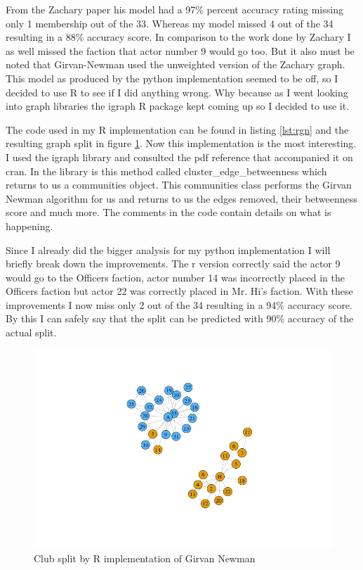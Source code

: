 \documentclass[letterpaper,10pt]{article}
\begin{document}
From the Zachary paper his model had a 97\% percent accuracy rating missing only 1 membership out of the 33. Whereas my model missed 4 out of the 34 resulting in a 88\% accuracy score. In comparison to the work done by Zachary I as well missed the faction that actor number 9 would go too. But it also must be noted that Girvan-Newman used the unweighted version of the Zachary graph.
\newline \newline
This model as produced by the python implementation seemed to be off, so I decided to use R to see if I did anything wrong. Why because as I went looking into graph libraries the igraph R package kept coming up so I decided to use it. 

The code used in my R implementation can be found in listing \ref{lst:rgn} and the resulting graph split in figure \ref{fig:psplit2}. Now this implementation is the most interesting. I used the igraph library and consulted the pdf reference that accompanied it on cran\cite{igraph}. In the library is this method called cluster\_edge\_betweenness which returns to us a communities object. This communities class performs the Girvan Newman algorithm for us and returns to us the edges removed, their betweenness score and much more. The comments in the code contain details on what is happening.

Since I already did the bigger analysis for my python implementation I will briefly break down the improvements. The r version correctly said the actor 9 would go to the Officers faction, actor number 14 was incorrectly placed in the Officers faction but actor 22 was correctly placed in Mr. Hi's faction. With these improvements I now miss only 2 out of the 34 resulting in a 94\% accuracy score. 
\newline
By this I can safely say that the split can be predicted with 90\% accuracy of the actual split. 


\begin{figure}
\begin{center}
\includegraphics[scale=0.5]{RSplitClub.png}
\caption{Club split by R implementation of Girvan Newman}
\label{fig:psplit2}
\end{center}
\end{figure}
\end{document}
